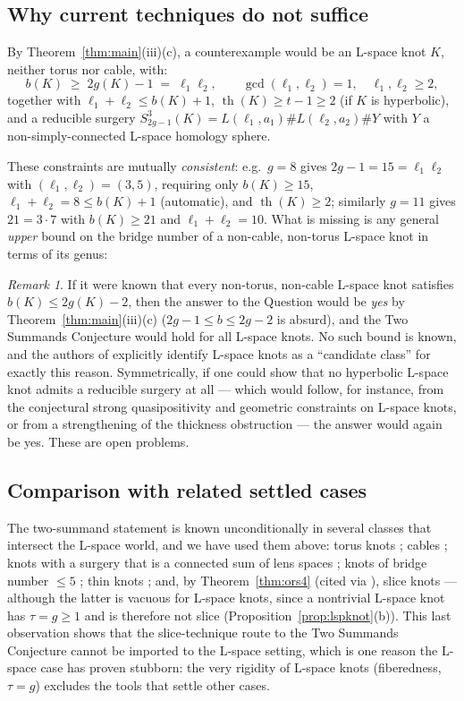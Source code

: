 \documentclass[11pt]{amsart}
\theoremstyle{definition}
\theoremstyle{remark}
\newtheorem{remark}[theorem]{Remark}
\numberwithin{equation}{section}
\begin{document}
\subsection{Why current techniques do not suffice}

By Theorem~\ref{thm:main}(iii)(c), a counterexample would be an L-space
knot $K$, neither torus nor cable, with:
\[
b(K)\;\ge\;2g(K)-1\;=\;\ell_{1}\ell_{2},\qquad
\gcd(\ell_{1},\ell_{2})=1,\quad\ell_{1},\ell_{2}\ge2,
\]
together with $\ell_{1}+\ell_{2}\le b(K)+1$,
$\operatorname{th}(K)\ge t-1\ge2$ (if $K$ is hyperbolic), and a reducible
surgery $S^{3}_{2g-1}(K)=L(\ell_{1},a_{1})\#L(\ell_{2},a_{2})\#Y$ with
$Y$ a non-simply-connected L-space homology sphere.

These constraints are mutually \emph{consistent}: e.g.\ $g=8$ gives
$2g-1=15=\ell_{1}\ell_{2}$ with $(\ell_{1},\ell_{2})=(3,5)$, requiring
only $b(K)\ge15$, $\ell_{1}+\ell_{2}=8\le b(K)+1$ (automatic), and
$\operatorname{th}(K)\ge2$; similarly $g=11$ gives $21=3\cdot7$ with
$b(K)\ge21$ and $\ell_{1}+\ell_{2}=10$. What is missing is any general
\emph{upper} bound on the bridge number of a non-cable, non-torus
L-space knot in terms of its genus:

\begin{remark}
If it were known that every non-torus, non-cable L-space knot satisfies
$b(K)\le 2g(K)-2$, then the answer to the Question would be \emph{yes}
by Theorem~\ref{thm:main}(iii)(c) ($2g-1\le b\le2g-2$ is absurd), and the
Two Summands Conjecture would hold for all L-space knots. No such bound
is known, and the authors of \cite{GW} explicitly identify L-space knots
as a ``candidate class'' for exactly this reason. Symmetrically, if one
could show that no hyperbolic L-space knot admits a reducible surgery at
all --- which would follow, for instance, from the conjectural strong
quasipositivity and geometric constraints on L-space knots, or from a
strengthening of the thickness obstruction \cite{ORS} --- the answer
would again be yes. These are open problems.
\end{remark}

\subsection{Comparison with related settled cases}

The two-summand statement is known unconditionally in several classes
that intersect the L-space world, and we have used them above: torus
knots \cite{Moser}; cables \cite{GL1,GL2}; knots with a surgery that is a
connected sum of lens spaces \cite{Greene}; knots of bridge number
$\le5$ \cite{GW}; thin knots \cite{ORS}; and, by
Theorem~\ref{thm:ors4} (cited via \cite{ORS}), slice knots --- although
the latter is vacuous for L-space knots, since a nontrivial L-space knot
has $\tau=g\ge1$ and is therefore not slice
(Proposition~\ref{prop:lspknot}(b)). This last observation shows that the
slice-technique route to the Two Summands Conjecture cannot be imported
to the L-space setting, which is one reason the L-space case has proven
stubborn: the very rigidity of L-space knots (fiberedness, $\tau=g$)
excludes the tools that settle other cases.
\end{document}
